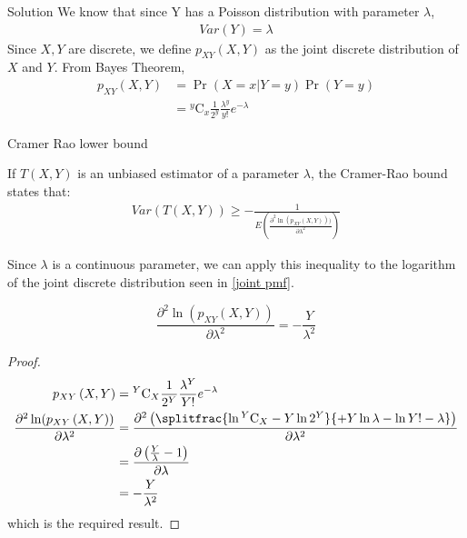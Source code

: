 \documentclass{beamer}
\providecommand{\pr}[1]{\ensuremath{\Pr\left(#1\right)}}
\providecommand{\brak}[1]{\ensuremath{\left(#1\right)}}
\newcommand{\comb}[2]{{}^{#1}\mathrm{C}_{#2}}
\begin{document}
\begin{frame}{Solution}
We know that since Y has a Poisson distribution with parameter $\lambda$, 
\begin{align}
    Var(Y)=\lambda \label{Var=lam}
\end{align}
Since $X, Y$ are discrete, we define $ p_{XY}\brak{X, Y}$ as the joint discrete distribution of $X$ and $Y$.
From Bayes Theorem,
\begin{align}
    p_{XY}\brak{X, Y}&=\pr{X=x|Y=y} \pr{Y=y}  \\
    &= \comb{y}{x} \frac{1}{2^y} \frac{\lambda^y}{y!} e^{- \lambda}\label{joint pmf}
\end{align} 
    
\end{frame}
\begin{frame}{Cramer Rao lower bound}
\begin{definition} 
If $T(X, Y)$ is an unbiased estimator of a parameter $\lambda$, the Cramer-Rao bound states that:
\begin{align}
    Var\brak{T\brak{X,Y}}\geq -\frac{1}{E\brak{\frac{\partial^2 \ln(p_{XY}\brak{X, Y}))}{\partial\lambda^2}}} \label{def CRB}
\end{align}
\end{definition}
\begin{block}{}
Since $\lambda$ is a continuous parameter, we can apply this inequality to the logarithm of the joint discrete distribution seen in \eqref{joint pmf}.

\end{block}
\end{frame}
\begin{frame}{}
\begin{lemma}
\begin{equation}
    \frac{\partial^2 \ln(p_{XY}\brak{X, Y})}{\partial\lambda^2}=-\frac{Y}{\lambda^2} \label{partial}
\end{equation}
\end{lemma}
\begin{proof}
\begin{align}
p_{XY}\brak{X, Y}&= \comb{Y}{X} \frac{1}{2^Y} \frac{\lambda^Y}{Y!}e^{- \lambda}\\
\frac{\partial^2 \ln(p_{XY}\brak{X, Y})}{\partial\lambda^2}&=\frac{\partial^2\brak{ \splitfrac{\ln{\comb{Y}{X}}-Y\ln{2^Y}}{+Y\ln{\lambda}-\ln{Y!}-\lambda}}}{\partial\lambda^2}\\
&=\frac{\partial\brak{ \frac{Y}{\lambda}-1}}{\partial\lambda}\\
&=-\frac{Y}{\lambda^2}
\end{align}
which is the required result.
\end{proof}
    
\end{frame}
\end{document}
